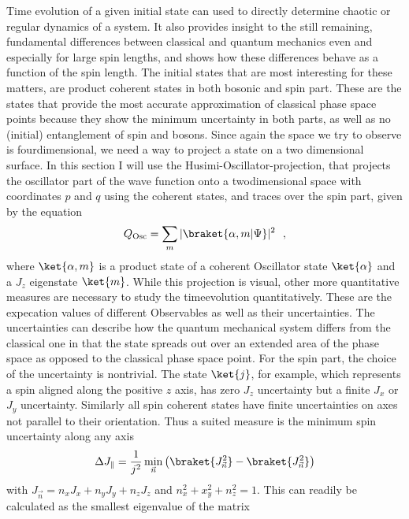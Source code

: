 Time evolution of a given initial state can used to directly determine chaotic or regular dynamics of a system. 
It also provides insight to the still remaining, fundamental differences between classical and quantum mechanics even and especially for large spin lengths, and shows how these differences behave as a function of the spin length.
The initial states that are most interesting for these matters, are product coherent states in both bosonic and spin part.
These are the states that provide the most accurate approximation of classical phase space points because they show the minimum uncertainty in both parts, as well as no (initial) entanglement of spin and bosons.
Since again the space we try to observe is fourdimensional, we need a way to project a state on a two dimensional surface. 
In this section I will use the Husimi-Oscillator-projection, that projects the oscillator part of the wave function onto a twodimensional space with coordinates $p$ and $q$ using the coherent states, and traces over the spin part, given by the equation
\begin{equation}
 Q_\text{Osc} = \sum\limits_{m} |\braket{\alpha,m | \Psi}|^2~~, 
\end{equation}
where $\ket{\alpha,m}$ is a product state of a coherent Oscillator state $\ket{\alpha}$ and a $J_z$ eigenstate $\ket{m}$.
While this projection is visual, other more quantitative measures are necessary to study the timeevolution quantitatively.
These are the expecation values of different Observables as well as their uncertainties.
The uncertainties can describe how the quantum mechanical system differs from the classical one in that the state spreads out over an extended area of the phase space as opposed to the classical phase space point.
For the spin part, the choice of the uncertainty is nontrivial.
The state $\ket{j}$, for example, which represents a spin aligned along the positive $z$ axis, has zero $J_z$ uncertainty but a finite $J_x$ or $J_y$ uncertainty.
Similarly all spin coherent states have finite uncertainties on axes not parallel to their orientation.
Thus a suited measure is the minimum spin uncertainty along any axis
\begin{equation}
  \Delta J_\parallel = \frac{1}{j^2}\min\limits_{\vec{n}} \left( \braket{J_{\vec{n}}^2} - \braket{J_{\vec{n}}^2}\right) 
\end{equation}
with $J_{\vec{n}} = n_x J_x + n_y J_y + n_z J_z$ and $n_x^2 + x_y^2 + n_z^2 = 1$.
This can readily be calculated as the smallest eigenvalue of the matrix
